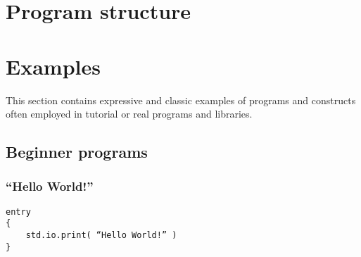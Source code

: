 \documentclass[a4paper,11pt]{article}
\begin{document}
\section{Program structure}


\section{Examples}
This section contains expressive and classic examples of programs and constructs often employed in tutorial or real programs and libraries.

  \subsection{Beginner programs}

    \subsubsection{“Hello World!”}

\begin{lstlisting}
entry
{
    std.io.print( “Hello World!” )
}
\end{lstlisting}
\end{document}
